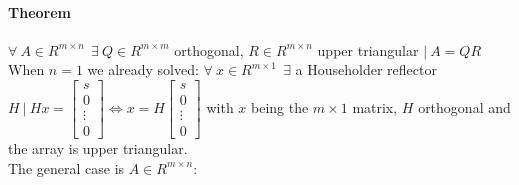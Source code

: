 \documentclass[10pt]{report}
\begin{document}
\paragraph{Theorem} $\forall\:A\in R^{m\times n}\:\:\exists\:Q\in R^{m\times m}$ orthogonal, $R\in R^{m\times n}$ upper triangular $|\:A = QR$\\
When $n = 1$ we already solved: $\forall\:x\in R^{m\times 1}\:\:\exists$ a Householder reflector $H\:|\:Hx = \left[\begin{array}{c}
s\\0\\\vdots\\0
\end{array}\right] \Leftrightarrow x = H\left[\begin{array}{c}
s\\0\\\vdots\\0
\end{array}\right]$ with $x$ being the $m\times 1$ matrix, $H$ orthogonal and the array is upper triangular.\\
The general case is $A\in R^{m\times n}$:
\end{document}
